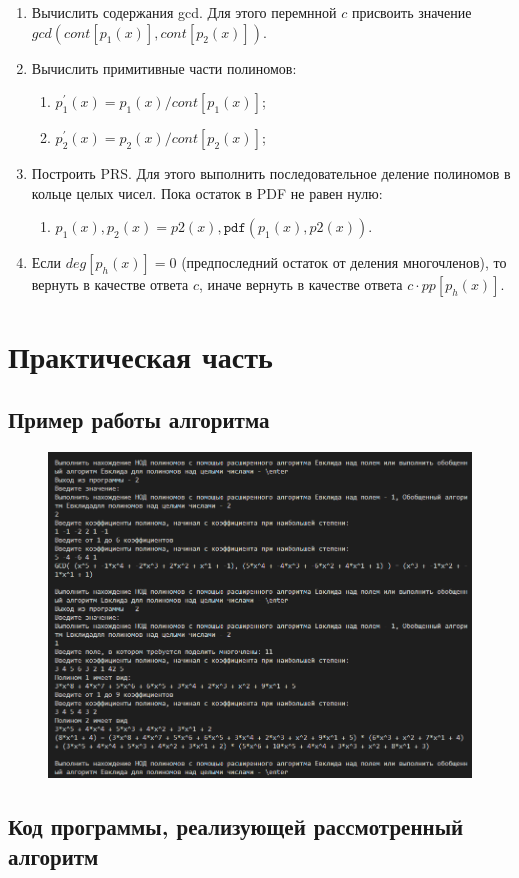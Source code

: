 \documentclass[bachelor, och, labwork]{shiza}
\begin{document}
\begin{enumerate}
    
    \item Вычислить содержания gcd. Для этого перемнной $c$ присвоить значение
    $gcd(cont[p_1(x)], cont[p_2(x)])$.

    \item Вычислить примитивные части полиномов:
    \begin{enumerate}
        \item $p^{'}_1(x) = p_1(x) / cont[p_1(x)]$;
        \item $p^{'}_2(x) = p_2(x) / cont[p_2(x)]$;
    \end{enumerate}
    \item Построить PRS. Для этого выполнить последовательное деление полиномов
    в кольце целых чисел. Пока остаток в PDF не равен нулю:
    \begin{enumerate}
        \item $p_1(x), p_2(x) = p2(x), \mathtt{pdf}(p_1(x), p2(x))$.
    \end{enumerate}
    \item Если $deg[p_h(x)] = 0$ (предпоследний остаток от деления многочленов),
    то вернуть в качестве ответа $c$, иначе вернуть в качестве ответа
    $c\cdot pp[p_h(x)]$.
\end{enumerate}

\section{Практическая часть}
\subsection{Пример работы алгоритма}
\begin{figure}[H]
    \centering
    \includegraphics[width=1\textwidth]{pic1.png}
    \caption{}
\end{figure}

    \subsection{Код программы, реализующей рассмотренный алгоритм}
        \inputminted{python}{lab14.py}
\end{document}
